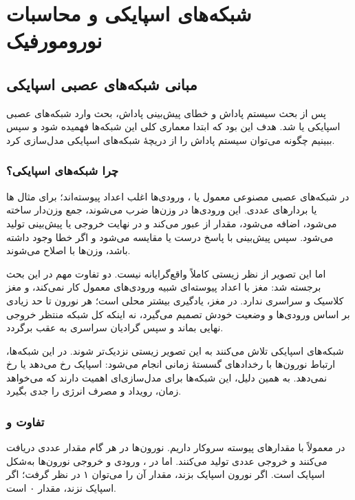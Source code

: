 \chapter{شبکه‌های اسپایکی و محاسبات نورومورفیک}

\section{مبانی شبکه‌های عصبی اسپایکی}
پس از بحث سیستم پاداش و خطای پیش‌بینی پاداش، بحث وارد شبکه‌های عصبی اسپایکی یا  شد. هدف این بود که ابتدا معماری کلی این شبکه‌ها فهمیده شود و سپس ببینیم چگونه می‌توان سیستم پاداش را از دریچهٔ شبکه‌های اسپایکی مدل‌سازی کرد.

\subsection{چرا شبکه‌های اسپایکی؟}
در شبکه‌های عصبی مصنوعی معمول یا ، ورودی‌ها اغلب اعداد پیوسته‌اند؛ برای مثال ها یا بردارهای عددی. این ورودی‌ها در وزن‌ها ضرب می‌شوند، جمع وزن‌دار ساخته می‌شود،  اضافه می‌شود، مقدار از  عبور می‌کند و در نهایت خروجی یا پیش‌بینی تولید می‌شود. سپس پیش‌بینی با پاسخ درست یا  مقایسه می‌شود و اگر خطا وجود داشته باشد، وزن‌ها با  اصلاح می‌شوند.

اما این تصویر از نظر زیستی کاملاً واقع‌گرایانه نیست. دو تفاوت مهم در این بحث برجسته شد: مغز با اعداد پیوسته‌ای شبیه ورودی‌های معمول  کار نمی‌کند، و مغز  کلاسیک و سراسری ندارد. در مغز، یادگیری بیشتر محلی است؛ هر نورون تا حد زیادی بر اساس ورودی‌ها و وضعیت خودش تصمیم می‌گیرد، نه اینکه کل شبکه منتظر خروجی نهایی بماند و سپس گرادیان سراسری به عقب برگردد.

شبکه‌های اسپایکی تلاش می‌کنند به این تصویر زیستی نزدیک‌تر شوند. در این شبکه‌ها، ارتباط نورون‌ها با رخدادهای گسستهٔ زمانی انجام می‌شود: اسپایک رخ می‌دهد یا رخ نمی‌دهد. به همین دلیل، این شبکه‌ها برای مدل‌سازی‌ای اهمیت دارند که می‌خواهد زمان، رویداد و مصرف انرژی را جدی بگیرد.

\subsection{تفاوت  و }
در  معمولاً با مقدارهای پیوسته سروکار داریم. نورون‌ها در هر گام مقدار عددی دریافت می‌کنند و خروجی عددی تولید می‌کنند. اما در ، ورودی و خروجی نورون‌ها به‌شکل اسپایک است. اگر نورون اسپایک بزند، مقدار آن را می‌توان ۱ در نظر گرفت؛ اگر اسپایک نزند، مقدار ۰ است.

